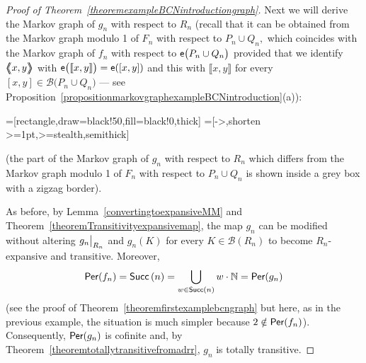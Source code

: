 \documentclass[a4paper, 11pt]{amsart}
\numberwithin{equation}{section}
\theoremstyle{customnumberedtheorem}
\theoremstyle{definitionwithbfnote}
\newcommand{\N}{\ensuremath{\mathbb{N}}}
\DeclareMathOperator{\Per}{\textsf{\upshape Per}}
\DeclareMathOperator{\Succ}{\textsf{\upshape Succ}}
\DeclareMathOperator{\eexp}{\textsf{\upshape e}}
\newcommand{\succs}[1]{\ensuremath{\Succ\left(#1\right)}}
\newcommand{\BIclass}[1]{\ensuremath{\llbracket #1\rrbracket}}
\newcommand{\BIgraph}[1]{\ensuremath{\mathopen{\bigl\langle\mkern-7.8mu\bigl\langle\mspace{-6.5mu}\bigl\langle} #1 \mathclose{\bigr\rangle\mspace{-6.5mu}\bigr\rangle\mkern-7.8mu\bigr\rangle}}}
\newcommand{\emap}[1]{\ensuremath{\eexp(#1)}}
\newcommand{\bigemap}[1]{\ensuremath{\eexp\bigl(#1\bigr)}}
\def\calB{\mathcal{B}}
\newcommand{\SBI}[1][Q]{\ensuremath{\calB(#1)}}
\newcommand{\bigSBI}[1]{\ensuremath{\calB\bigl(#1\bigr)}}
\newcommand{\evalat}[1]{\bigr\rvert\sb{#1}}
\begin{document}
\begin{proof}[Proof of Theorem~\ref{theoremexampleBCNintroductiongraph}]
Next we will derive the Markov graph of $g_n$ with respect to $R_n$
(recall that it can be obtained from the Markov graph modulo 1 of
$F_n$ with respect to $P_n \cup Q_n,$
which coincides with the Markov graph of $f_n$ with respect to
$\bigemap{P_n \cup Q_n}$ provided that we identify
$\BIgraph{x,y}$ with $\bigemap{\BIclass{x,y}} = \emap{[x,y]}$ and this
with $\BIclass{x,y}$ for every $[x,y] \in \bigSBI{P_n \cup Q_n}$ ---
see Proposition~\ref{propositionmarkovgraphexampleBCNintroduction}(a)):
\begin{center}\small
{}=[rectangle,draw=black!50,fill=black!0,thick]
=[->,shorten >=1pt,>=stealth,semithick]
\medskip
{}
\end{center}
(the part of the Markov graph of $g_n$ with respect to $R_n$
which differs from the Markov graph modulo 1 of $F_n$ with respect to
$P_n \cup Q_n$ is shown inside a grey box with a zigzag border).


As before, by
Lemma~\ref{convertingtoexpansiveMM} and
Theorem~\ref{theoremTransitivityexpansivemap},
the map $g_n$ can be modified
without altering $g_n\evalat{R_n}$ and $g_n(K)$
for every $K \in \SBI[R_n]$ to become
$R_n$-expansive and transitive.
Moreover,
\[ \Per(f_n) = \succs{n} = \bigcup_{w\in\succs{n}} w\cdot\N = \Per(g_n) \]
(see the proof of Theorem~\ref{theoremfirstexamplebcngraph} but
here,  as in the previous example, the situation is much simpler
because $2 \notin \Per(f_n)$).
Consequently, $\Per(g_n)$ is cofinite and,
by Theorem~\ref{theoremtotallytransitivefromadrr},
$g_n$ is totally transitive.


\end{proof}
\end{document}
